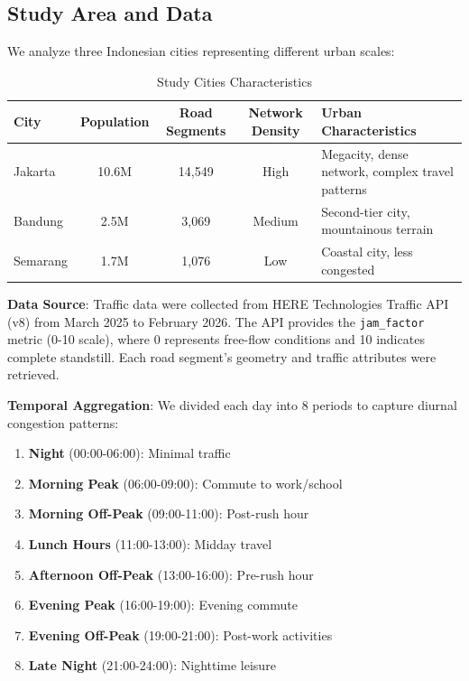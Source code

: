\documentclass[11pt,a4paper]{article}
\begin{document}
\subsection{Study Area and Data}

We analyze three Indonesian cities representing different urban scales:

\begin{table}[H]
\centering
\caption{Study Cities Characteristics}
\label{tab:cities}
\begin{tabular}{@{}lcccp{5cm}@{}}
\toprule
City & Population & Road Segments & Network Density & Urban Characteristics \\
\midrule
Jakarta & 10.6M & 14,549 & High & Megacity, dense network, complex travel patterns \\
Bandung & 2.5M & 3,069 & Medium & Second-tier city, mountainous terrain \\
Semarang & 1.7M & 1,076 & Low & Coastal city, less congested \\
\bottomrule
\end{tabular}
\end{table}

\textbf{Data Source}: Traffic data were collected from HERE Technologies Traffic API (v8) from March 2025 to February 2026. The API provides the \texttt{jam\_factor} metric (0-10 scale), where 0 represents free-flow conditions and 10 indicates complete standstill. Each road segment's geometry and traffic attributes were retrieved.

\textbf{Temporal Aggregation}: We divided each day into 8 periods to capture diurnal congestion patterns:

\begin{enumerate}
    \item \textbf{Night} (00:00-06:00): Minimal traffic
    \item \textbf{Morning Peak} (06:00-09:00): Commute to work/school
    \item \textbf{Morning Off-Peak} (09:00-11:00): Post-rush hour
    \item \textbf{Lunch Hours} (11:00-13:00): Midday travel
    \item \textbf{Afternoon Off-Peak} (13:00-16:00): Pre-rush hour
    \item \textbf{Evening Peak} (16:00-19:00): Evening commute
    \item \textbf{Evening Off-Peak} (19:00-21:00): Post-work activities
    \item \textbf{Late Night} (21:00-24:00): Nighttime leisure
\end{enumerate}
\end{document}
